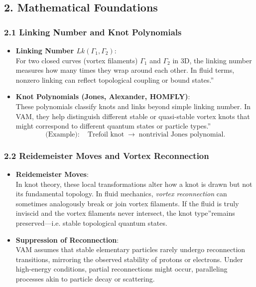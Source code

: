 \documentclass[a4paper,12pt]{article}
\begin{document}
\subsection*{2. Mathematical Foundations}

\subsubsection*{2.1 Linking Number and Knot Polynomials}

\begin{itemize}
    \item \textbf{Linking Number \(Lk(\Gamma_1, \Gamma_2)\)}: \\
    For two closed curves (vortex filaments) \(\Gamma_1\) and \(\Gamma_2\) in 3D, the linking number measures how many times they wrap around each other. In fluid terms, nonzero linking can reflect topological coupling or \grqq bound states.\textquotedblright
    \item \textbf{Knot Polynomials (Jones, Alexander, HOMFLY)}: \\
    These polynomials classify knots and links beyond simple linking number. In VAM, they help distinguish different stable or quasi-stable vortex knots that might correspond to different quantum states or particle \grqq types.\textquotedblright
    \[
        \text{(Example)}:\quad
        \text{Trefoil knot}\;\longrightarrow\;\text{nontrivial Jones polynomial.}
    \]
\end{itemize}

\subsubsection*{2.2 Reidemeister Moves and Vortex Reconnection}

\begin{itemize}
    \item \textbf{Reidemeister Moves}: \\
    In knot theory, these local transformations alter how a knot is drawn but not its fundamental topology. In fluid mechanics, \textit{vortex reconnection} can sometimes analogously break or join vortex filaments. If the fluid is truly inviscid and the vortex filaments never intersect, the \grqq knot type\textquotedblright remains preserved—i.e. stable topological quantum states.
    \item \textbf{Suppression of Reconnection}: \\
    VAM assumes that stable elementary particles rarely undergo reconnection transitions, mirroring the observed stability of protons or electrons. Under high-energy conditions, partial reconnections might occur, paralleling processes akin to particle decay or scattering.
\end{itemize}
\end{document}

